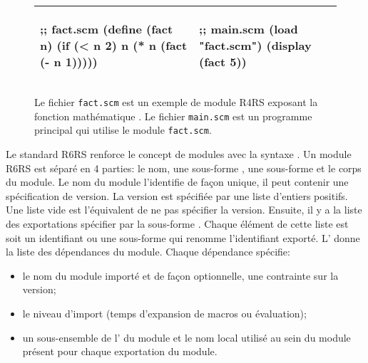 \begin{figure}[ht]
  \begin{center}
    \begin{tabular}{|l|l|}
    \hline
    \begin{mplisting}{0.4}
;; fact.scm
(define (fact n)
  (if (< n 2)
    n
    (* n (fact (- n 1)))))
\end{mplisting} &
    \begin{mplisting}{0.4}
;; main.scm
(load "fact.scm")
(display (fact 5))
\end{mplisting} \\\hline
    \end{tabular}
  \end{center}

  \caption{Le fichier \texttt{fact.scm} est un exemple de module R4RS exposant
  la fonction mathématique . Le fichier \texttt{main.scm} est un
  programme principal qui utilise le module \texttt{fact.scm}.}
  \label{fig:r4rs_fact}
\end{figure}



Le standard R6RS\cite{Scheme:R6RS} renforce le concept de modules avec la
syntaxe .  Un module R6RS est séparé en 4 parties: le nom, une
sous-forme , une sous-forme  et le corps du
module. Le nom du module l'identifie de façon unique, il peut contenir une
spécification de version. La version est spécifiée par une liste d'entiers
positifs. Une liste vide \lstcode{()} est l'équivalent de ne pas spécifier la
version. Ensuite, il y a la liste des exportations spécifier par la sous-forme
. Chaque élément de cette liste est soit un identifiant ou une
sous-forme  qui renomme l'identifiant exporté.
L' donne la liste des dépendances du module. Chaque dépendance
spécifie:

\begin{itemize}
  \item le nom du module importé et de façon optionnelle, une contrainte sur
    la version;
  \item le niveau d'import (temps d'expansion de macros ou évaluation);
  \item un sous-ensemble de l' du module et le nom local
    utilisé au sein du module présent pour chaque exportation du module.
\end{itemize}


